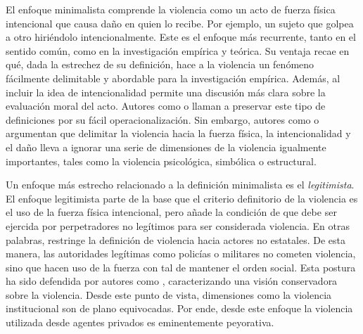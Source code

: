 \documentclass[12pt,twoside]{templates/facsothesis}
\begin{document}
El enfoque minimalista comprende la violencia como un acto de fuerza física intencional que causa daño en quien lo recibe. Por ejemplo, un sujeto que golpea a otro hiriéndolo intencionalmente. Este es el enfoque más recurrente, tanto en el sentido común, como en la investigación empírica y teórica. Su ventaja recae en qué, dada la estrechez de su definición, hace a la violencia un fenómeno fácilmente delimitable y abordable para la investigación empírica. Además, al incluir la idea de intencionalidad permite una discusión más clara sobre la evaluación moral del acto. Autores como \citet{Keane2004} o \citet{Coady2008} llaman a preservar este tipo de definiciones por su fácil operacionalización. Sin embargo, autores como \citet{Galtung1969} o \citet{Bufacchi2007} argumentan que delimitar la violencia hacia la fuerza física, la intencionalidad y el daño lleva a ignorar una serie de dimensiones de la violencia igualmente importantes, tales como la violencia psicológica, simbólica o estructural.

Un enfoque más estrecho relacionado a la definición minimalista es el \emph{legitimista}. El enfoque legitimista parte de la base que el criterio definitorio de la violencia es el uso de la fuerza física intencional, pero añade la condición de que debe ser ejercida por perpetradores no legítimos para ser considerada violencia. En otras palabras, restringe la definición de violencia hacia actores no estatales. De esta manera, las autoridades legítimas como policías o militares no cometen violencia, sino que hacen uso de la fuerza con tal de mantener el orden social. Esta postura ha sido defendida por autores como \citet{Hook1976}, caracterizando una visión conservadora sobre la violencia. Desde este punto de vista, dimensiones como la violencia institucional son de plano equivocadas. Por ende, desde este enfoque la violencia utilizada desde agentes privados es eminentemente peyorativa.
\end{document}
